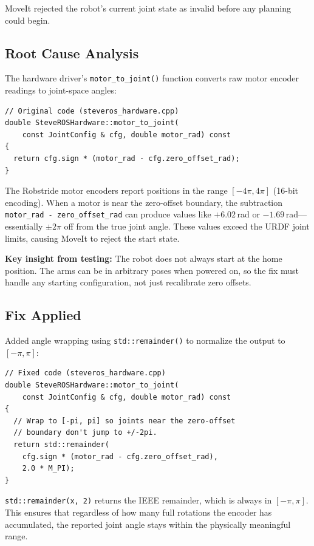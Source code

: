 \documentclass[11pt,a4paper]{article}
\begin{document}
MoveIt rejected the robot's current joint state as invalid before any planning could begin.

\subsection{Root Cause Analysis}
The hardware driver's \texttt{motor\_to\_joint()} function converts raw motor encoder
readings to joint-space angles:

\begin{lstlisting}
// Original code (steveros_hardware.cpp)
double SteveROSHardware::motor_to_joint(
    const JointConfig & cfg, double motor_rad) const
{
  return cfg.sign * (motor_rad - cfg.zero_offset_rad);
}
\end{lstlisting}

The Robstride motor encoders report positions in the range $[-4\pi, 4\pi]$ (16-bit encoding).
When a motor is near the zero-offset boundary, the subtraction
\texttt{motor\_rad - zero\_offset\_rad} can produce values like $+6.02$\,rad or
$-1.69$\,rad---essentially $\pm 2\pi$ off from the true joint angle. These values
exceed the URDF joint limits, causing MoveIt to reject the start state.

\textbf{Key insight from testing:} The robot does not always start at the home position.
The arms can be in arbitrary poses when powered on, so the fix must handle any starting
configuration, not just recalibrate zero offsets.

\subsection{Fix Applied}

Added angle wrapping using \texttt{std::remainder()} to normalize the output to $[-\pi, \pi]$:

\begin{lstlisting}
// Fixed code (steveros_hardware.cpp)
double SteveROSHardware::motor_to_joint(
    const JointConfig & cfg, double motor_rad) const
{
  // Wrap to [-pi, pi] so joints near the zero-offset
  // boundary don't jump to +/-2pi.
  return std::remainder(
    cfg.sign * (motor_rad - cfg.zero_offset_rad),
    2.0 * M_PI);
}
\end{lstlisting}

\texttt{std::remainder(x, 2\pi)} returns the IEEE remainder, which is always in
$[-\pi, \pi]$. This ensures that regardless of how many full rotations the encoder
has accumulated, the reported joint angle stays within the physically meaningful range.
\end{document}
